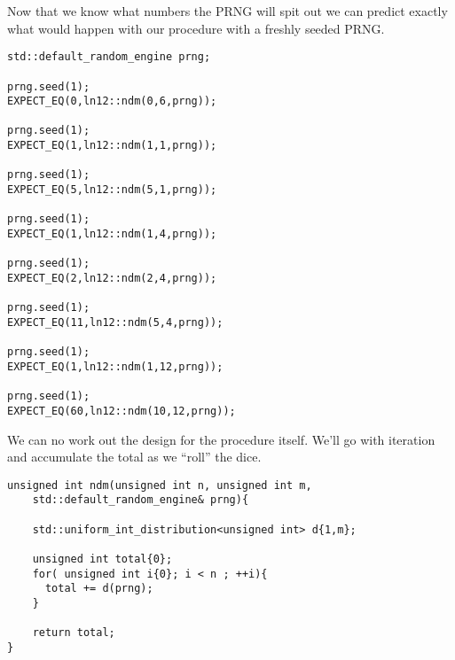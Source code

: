 \documentclass[]{tufte-handout}
\begin{document}
Now that we know what numbers the PRNG will spit out we can predict exactly what would happen with our procedure with a freshly seeded PRNG.
\begin{verbatim}
std::default_random_engine prng;

prng.seed(1);
EXPECT_EQ(0,ln12::ndm(0,6,prng));

prng.seed(1);
EXPECT_EQ(1,ln12::ndm(1,1,prng));

prng.seed(1);
EXPECT_EQ(5,ln12::ndm(5,1,prng));

prng.seed(1);
EXPECT_EQ(1,ln12::ndm(1,4,prng));

prng.seed(1);
EXPECT_EQ(2,ln12::ndm(2,4,prng));

prng.seed(1);
EXPECT_EQ(11,ln12::ndm(5,4,prng));

prng.seed(1);
EXPECT_EQ(1,ln12::ndm(1,12,prng));

prng.seed(1);
EXPECT_EQ(60,ln12::ndm(10,12,prng));
\end{verbatim}


We can no work out the design for the procedure itself.  We'll go with iteration and accumulate the total as we ``roll'' the dice.
\begin{verbatim}
unsigned int ndm(unsigned int n, unsigned int m,
	std::default_random_engine& prng){

    std::uniform_int_distribution<unsigned int> d{1,m};

    unsigned int total{0};
    for( unsigned int i{0}; i < n ; ++i){
      total += d(prng);
    }

    return total;
}
\end{verbatim}
\end{document}
